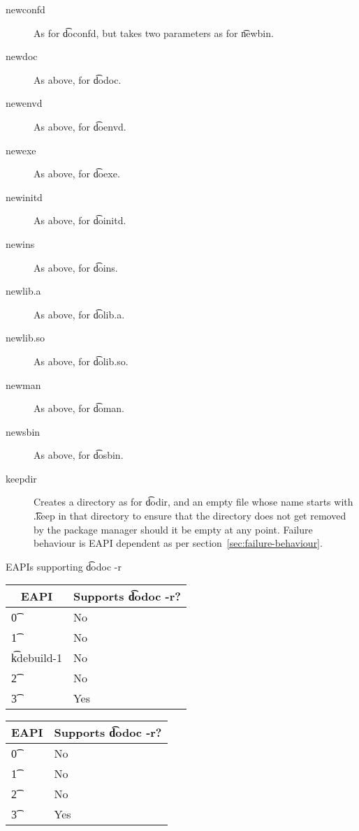 \begin{description}
\item[newconfd] As for \t{doconfd}, but takes two parameters as for \t{newbin}.

\item[newdoc] As above, for \t{dodoc}.

\item[newenvd] As above, for \t{doenvd}.

\item[newexe] As above, for \t{doexe}.

\item[newinitd] As above, for \t{doinitd}.

\item[newins] As above, for \t{doins}.

\item[newlib.a] As above, for \t{dolib.a}.

\item[newlib.so] As above, for \t{dolib.so}.

\item[newman] As above, for \t{doman}.

\item[newsbin] As above, for \t{dosbin}.

\item[keepdir] Creates a directory as for \t{dodir}, and an empty file whose name starts with
    \t{.keep} in that directory to ensure that the directory does not get removed by the
    package manager should it be empty at any point. Failure behaviour is EAPI dependent as per
    section~\ref{sec:failure-behaviour}.

\end{description}

\begin{centertable}{EAPIs supporting \t{dodoc -r}} \label{tab:dodoc-table}
\IFKDEBUILDELSE
{
    \begin{tabular}{ l l }
        \toprule
            \multicolumn{1}{c}{\textbf{EAPI}} &
            \multicolumn{1}{c}{\textbf{Supports \t{dodoc -r}?}} \\
            \midrule
    \t{0} & No \\
    \t{1} & No \\
    \t{kdebuild-1} & No \\
    \t{2} & No \\
    \t{3} & Yes \\
    \bottomrule
    \end{tabular}
}{
    \begin{tabular}{ l l }
        \toprule
            \multicolumn{1}{c}{\textbf{EAPI}} &
            \multicolumn{1}{c}{\textbf{Supports \t{dodoc -r}?}} \\
            \midrule
    \t{0} & No \\
    \t{1} & No \\
    \t{2} & No \\
    \t{3} & Yes \\
    \bottomrule
    \end{tabular}
}
\end{centertable}

